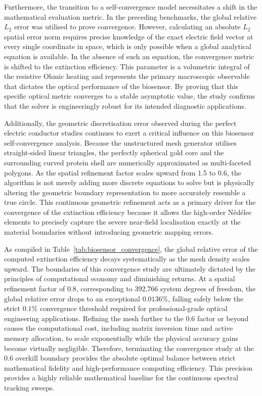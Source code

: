 \documentclass[class=report, crop=false]{standalone}
\begin{document}
\vspace{12pt}

Furthermore, the transition to a self-convergence model necessitates a shift in the mathematical evaluation metric. In the preceding benchmarks, the global relative $L_2$ error was utilised to prove convergence. However, calculating an absolute $L_2$ spatial error norm requires precise knowledge of the exact electric field vector at every single coordinate in space, which is only possible when a global analytical equation is available. In the absence of such an equation, the convergence metric is shifted to the extinction efficiency. This parameter is a volumetric integral of the resistive Ohmic heating and represents the primary macroscopic observable that dictates the optical performance of the biosensor. By proving that this specific optical metric converges to a stable asymptotic value, the study confirms that the solver is engineeringly robust for its intended diagnostic applications.

\vspace{12pt}

Additionally, the geometric discretisation error observed during the perfect electric conductor studies continues to exert a critical influence on this biosensor self-convergence analysis. Because the unstructured mesh generator utilises straight-sided linear triangles, the perfectly spherical gold core and the surrounding curved protein shell are numerically approximated as multi-faceted polygons. As the spatial refinement factor scales upward from 1.5 to 0.6, the algorithm is not merely adding more discrete equations to solve but is physically altering the geometric boundary representation to more accurately resemble a true circle. This continuous geometric refinement acts as a primary driver for the convergence of the extinction efficiency because it allows the high-order N\'{e}d\'{e}lec elements to precisely capture the severe near-field localisation exactly at the material boundaries without introducing geometric mapping errors.

\vspace{12pt}

As compiled in Table~\ref{tab:biosensor_convergence}, the global relative error of the computed extinction efficiency decays systematically as the mesh density scales upward. The boundaries of this convergence study are ultimately dictated by the principles of computational economy and diminishing returns. At a spatial refinement factor of 0.8, corresponding to 392,766 system degrees of freedom, the global relative error drops to an exceptional $0.0136\%$, falling safely below the strict $0.1\%$ convergence threshold required for professional-grade optical engineering applications. Refining the mesh further to the 0.6 factor or beyond causes the computational cost, including matrix inversion time and active memory allocation, to scale exponentially while the physical accuracy gains become virtually negligible. Therefore, terminating the convergence study at the 0.6 overkill boundary provides the absolute optimal balance between strict mathematical fidelity and high-performance computing efficiency. This precision provides a highly reliable mathematical baseline for the continuous spectral tracking sweeps.
\end{document}
